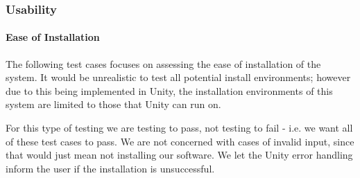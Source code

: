 \documentclass[12pt, titlepage]{article}
\begin{document}
\subsubsection{Usability}
		
\paragraph{Ease of Installation}
The following test cases focuses on assessing the ease of installation of the 
system. It would be unrealistic to test all potential install environments; 
however due to this being implemented in Unity, the installation environments 
of this system are limited to those that Unity can run on.

For this type of testing we are testing to pass, not testing to fail - i.e. we 
want all of these test cases to pass. We are not concerned with cases of 
invalid input, since that would just mean not installing our software. We let 
the Unity error handling inform the user if the installation is unsuccessful.
\end{document}
